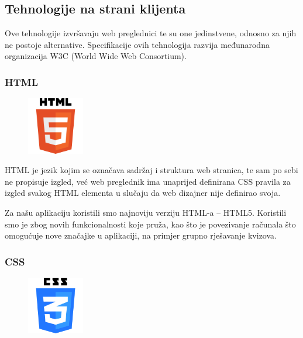 \documentclass[11pt]{scrreprt}
\begin{document}
\subsection{Tehnologije na strani klijenta}

Ove tehnologije izvršavaju web preglednici te su one jedinstvene, odnosno za
njih ne postoje alternative. Specifikacije ovih tehnologija razvija međunarodna
organizacija W3C (World Wide Web Consortium).

\subsubsection{HTML}

\begin{figure}
  \vspace{-10pt}
  \includegraphics[width=2.5cm]{logos/html}
  \vspace{-30pt}
\end{figure}

HTML je jezik kojim se označava sadržaj i struktura web stranica, te sam po sebi
ne propisuje izgled, već web preglednik ima unaprijed definirana CSS pravila za
izgled svakog HTML elementa u slučaju da web dizajner nije definirao
svoja.\cite{htmlncss}

Za našu aplikaciju koristili smo najnoviju verziju HTML-a -- HTML5. Koristili
smo je zbog novih funkcionalnosti koje pruža, kao što je povezivanje računala
što omogućuje nove značajke u aplikaciji, na primjer grupno rješavanje kvizova.

\subsubsection{CSS}

\begin{figure}
  \vspace{-10pt}
  \includegraphics[width=2.5cm]{logos/css}
  \vspace{-30pt}
\end{figure}
\end{document}
